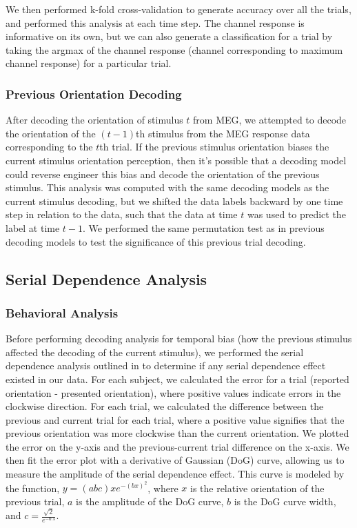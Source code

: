 \documentclass[../main.tex]{subfiles}
\begin{document}
We then performed k-fold cross-validation to generate accuracy over all the trials, and performed this analysis at each time step. The channel response is informative on its own, but we can also generate a classification for a trial by taking the argmax of the channel response (channel corresponding to maximum channel response) for a particular trial.

\subsubsection*{Previous Orientation Decoding}
After decoding the orientation of stimulus $t$ from MEG, we attempted to decode the orientation of the $(t-1)$th stimulus from the MEG response data corresponding to the $t$th trial. If the previous stimulus orientation biases the current stimulus orientation perception, then it's possible that a decoding model could reverse engineer this bias and decode the orientation of the previous stimulus. This analysis was computed with the same decoding models as the current stimulus decoding, but we shifted the data labels backward by one time step in relation to the data, such that the data at time $t$ was used to predict the label at time $t - 1$. We performed the same permutation test as in previous decoding models to test the significance of this previous trial decoding.

\subsection*{Serial Dependence Analysis}

\subsubsection*{Behavioral Analysis}
Before performing decoding analysis for temporal bias (how the previous stimulus affected the decoding of the current stimulus), we performed the serial dependence analysis outlined in \cite{fischer_whitney_2014} to determine if any serial dependence effect existed in our data. For each subject, we calculated the error for a trial (reported orientation - presented orientation), where positive values indicate errors in the clockwise direction. For each trial, we calculated the difference between the previous and current trial for each trial, where a positive value signifies that the previous orientation was more clockwise than the current orientation. We plotted the error on the y-axis and the previous-current trial difference on the x-axis. We then fit the error plot with a derivative of Gaussian (DoG) curve, allowing us to measure the amplitude of the serial dependence effect. This curve is modeled by the function, $y = (a b c) x e^{-(b x)^2}$, where $x$ is the relative orientation of the previous trial, $a$ is the amplitude of the DoG curve, $b$ is the DoG curve width, and
$c = \frac{\sqrt{2}}{e^{-0.5}}$.
\end{document}
